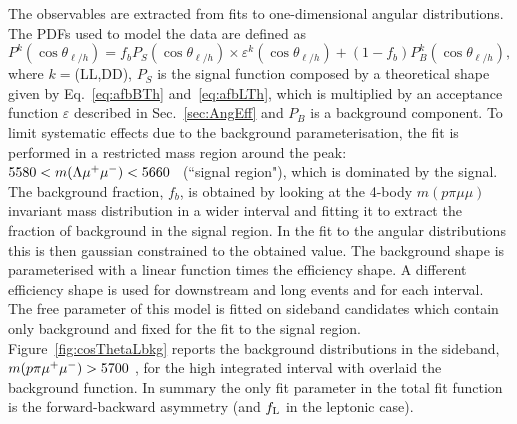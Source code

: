 The observables are extracted from fits to one-dimensional angular distributions.
%
%
The PDFs used to model the data are defined as
%
\begin{equation}
P^k(\cos\theta_{\ell/h}) = f_b P_S(\cos\theta_{\ell/h}) \times \varepsilon^k(\cos \theta_{\ell/h}) + 
		(1-f_b)P_B^k(\cos\theta_{\ell/h}),
\end{equation}
%
where $k=$(LL,DD), $P_S$ is the signal function composed by a theoretical shape given by Eq.~\ref{eq:afbBTh}
and~\ref{eq:afbLTh}, which is multiplied by an acceptance function $\varepsilon$ described in Sec.~\ref{sec:AngEff}
and $P_B$ is a background component. To limit systematic effects due to the background parameterisation, 
the fit is performed in a restricted mass region around the peak:
$5580 < m(\Lambda\mu^+\mu^-) < 5660 $ \mevcc ~(``signal region"), which is dominated by the signal.
The background fraction, $f_b$, is obtained by looking at the 4-body $m(p\pi\mu\mu)$ invariant mass
distribution in a wider interval and fitting it to extract the fraction of background in the signal region.
In the fit to the angular distributions this is then gaussian constrained to the obtained value.
The background shape is parameterised with a linear function times the efficiency shape.
A different efficiency shape is used for downstream and long events and for each \qsq interval.
The free parameter of this model is fitted on sideband candidates which contain only background
and fixed for the fit to the signal region. Figure~\ref{fig:cosThetaLbkg}
reports the background distributions in the sideband, $m(p\pi\mumu) > 5700$ \mevcc,
for the high \qsq integrated interval with overlaid the background function.
In summary the only fit parameter in the total fit function is the forward-backward asymmetry
(and $f_{\rm L}$ in the leptonic case). 

